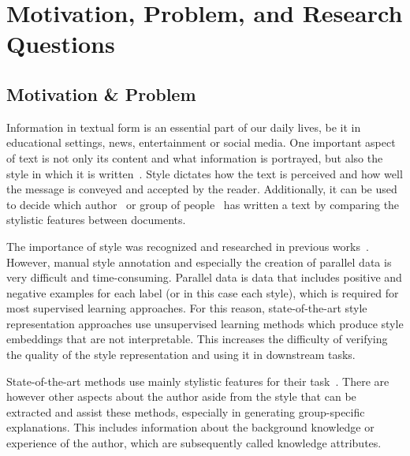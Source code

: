 
\section{Motivation, Problem, and Research Questions}

\subsection{Motivation \& Problem}
Information in textual form is an essential part of our daily lives, be it in educational settings, news, entertainment or social media. One important aspect of text is not only its content and what information is portrayed, but also the style in which it is written~\cite{wegmannSameAuthorJust2022}. Style dictates how the text is perceived and how well the message is conveyed and accepted by the reader. Additionally, it can be used to decide which author~\cite{alshomaryLatentSpaceInterpretation2024} or group of people~\cite{10.1007/978-3-642-29047-3_27} has written a text by comparing the stylistic features between documents.

The importance of style was recognized and researched in previous works~\cite{zhu-etal-2024-styleflow, ijcai2020p526,wegmannSameAuthorJust2022}. However, manual style annotation and especially the creation of parallel data is very difficult and time-consuming. Parallel data is data that includes positive and negative examples for each label (or in this case each style), which is required for most supervised learning approaches. For this reason, state-of-the-art style representation approaches use unsupervised learning methods which produce style embeddings that are not interpretable. This increases the difficulty of verifying the quality of the style representation and using it in downstream tasks.

State-of-the-art methods use mainly stylistic features for their task~\cite{alshomaryLatentSpaceInterpretation2024,patelLearningInterpretableStyle2023,konenStyleVectorsSteering2024,zhu-etal-2024-styleflow}. There are however other aspects about the author aside from the style that can be extracted and assist these methods, especially in generating group-specific explanations. This includes information about the background knowledge or experience of the author, which are subsequently called knowledge attributes.

